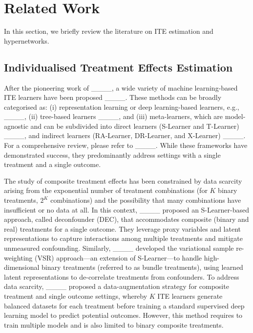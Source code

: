 \section{Related Work}
\label{sec_related_work}
In this section, we briefly review the literature on ITE estimation and hypernetworks.

\subsection{Individualised Treatment Effects Estimation}
\label{subsec_ITE}
After the pioneering work of ____, a wide variety of machine learning-based ITE learners have been proposed ____. These methods can be broadly categorised as: (i) representation learning or deep learning-based learners, e.g., ____, (ii) tree-based learners ____, and (iii) meta-learners, which are model-agnostic and can be subdivided into direct learners (S-Learner and T-Learner) ____, and indirect learners (RA-Learner, DR-Learner, and X-Learner) ____. For a comprehensive review, please refer to ____. While these frameworks have demonstrated success, they predominantly address settings with a single treatment and a single outcome.

The study of composite treatment effects has been constrained by data scarcity arising from the exponential number of treatment combinations (for $K$ binary treatments, $2^K$ combinations) and the possibility that many combinations have insufficient or no data at all. In this context, ____ proposed an S-Learner-based approach, called deconfounder (DEC), that accommodates composite (binary and real) treatments for a single outcome. They leverage proxy variables and latent representations to capture interactions among multiple treatments and mitigate unmeasured confounding. Similarly, ____ developed the variational sample re-weighting (VSR) approach—an extension of S-Learner—to handle high-dimensional binary treatments (referred to as bundle treatments), using learned latent representations to de-correlate treatments from confounders. To address data scarcity, ____ proposed a data-augmentation strategy for composite treatment and single outcome settings, whereby $K$ ITE learners generate balanced datasets for each treatment before training a standard supervised deep learning model to predict potential outcomes. However, this method requires to train multiple models and is also limited to binary composite treatments.


